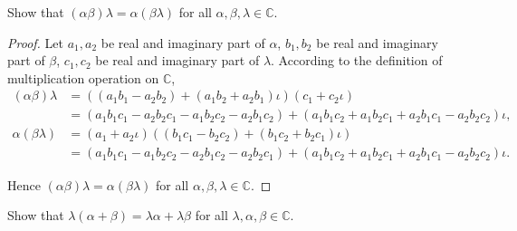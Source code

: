 \begin{exercise}
    Show that $(\alpha\beta)\lambda = \alpha(\beta\lambda)$ for all $\alpha, \beta, \lambda\in \mathbb{C}$.
\end{exercise}

\begin{proof}
    Let $a_{1}, a_{2}$ be real and imaginary part of $\alpha$, $b_{1}, b_{2}$ be real and imaginary part of $\beta$, $c_{1}, c_{2}$ be real and imaginary part of $\lambda$. According to the definition of multiplication operation on $\mathbb{C}$,
    \begin{align*}
        (\alpha\beta)\lambda & = ((a_{1}b_{1} - a_{2}b_{2}) + (a_{1}b_{2} + a_{2}b_{1})\iota) (c_{1} + c_{2}\iota)                                                                       \\
                             & = (a_{1}b_{1}c_{1} - a_{2}b_{2}c_{1} - a_{1}b_{2}c_{2} - a_{2}b_{1}c_{2}) + (a_{1}b_{1}c_{2} + a_{1}b_{2}c_{1} + a_{2}b_{1}c_{1} - a_{2}b_{2}c_{2})\iota, \\
        \alpha(\beta\lambda) & = (a_{1} + a_{2}\iota)((b_{1}c_{1} - b_{2}c_{2}) + (b_{1}c_{2} + b_{2}c_{1})\iota)                                                                        \\
                             & = (a_{1}b_{1}c_{1} - a_{1}b_{2}c_{2} - a_{2}b_{1}c_{2} - a_{2}b_{2}c_{1}) + (a_{1}b_{1}c_{2} + a_{1}b_{2}c_{1} + a_{2}b_{1}c_{1} - a_{2}b_{2}c_{2})\iota.
    \end{align*}

    Hence $(\alpha\beta)\lambda = \alpha(\beta\lambda)$ for all $\alpha, \beta, \lambda\in\mathbb{C}$.
\end{proof}

\begin{exercise}
    Show that $\lambda (\alpha + \beta) = \lambda\alpha + \lambda\beta$ for all $\lambda, \alpha, \beta\in\mathbb{C}$.
\end{exercise}

